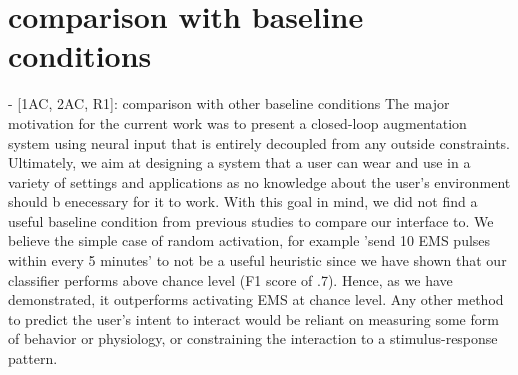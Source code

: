 

\section{comparison with baseline conditions}


- [1AC, 2AC, R1]: comparison with other baseline conditions
The major motivation for the current work was to present a closed-loop augmentation system using neural input that is entirely decoupled from any outside constraints. Ultimately, we aim at designing a system that a user can wear and use in a variety of settings and applications as no knowledge about the user's environment should b enecessary for it to work. With this goal in mind, we did not find a useful baseline condition from previous studies to compare our interface to. We believe the simple case of random activation, for example 'send 10 EMS pulses within every 5 minutes' to not be a useful heuristic since we have shown that our classifier performs above chance level (F1 score of .7). Hence, as we have demonstrated, it outperforms activating EMS at chance level. Any other method to predict the user's intent to interact would be reliant on measuring some form of behavior or physiology, or constraining the interaction to a stimulus-response pattern. 


